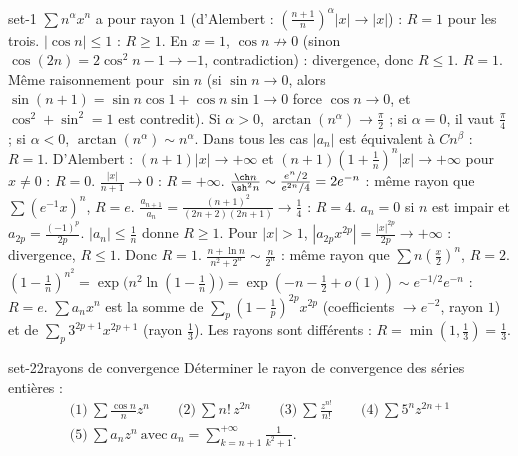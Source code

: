 \begin{corrige}{set-1}
 $\sum n^\alpha x^n$ a pour rayon $1$ (d'Alembert : $\left(\frac{n+1}n\right)^\alpha|x|\to|x|$) : $R=1$ pour les trois.
 $|\cos n|\leq1$ : $R\geq1$. En $x=1$, $\cos n\not\to0$ (sinon $\cos(2n)=2\cos^2n-1\to-1$, contradiction) : divergence, donc
$R\leq1$. $R=1$. Même raisonnement pour $\sin n$ (si $\sin n\to0$, alors $\sin(n+1)=\sin n\cos1+\cos n\sin1\to0$ force $\cos n\to0$, et
$\cos^2+\sin^2=1$ est contredit).
 Si $\alpha>0$, $\arctan(n^\alpha)\to\frac\pi2$ ; si $\alpha=0$, il vaut $\frac\pi4$ ; si $\alpha<0$, $\arctan(n^\alpha)\sim n^\alpha$. Dans tous les
cas $|a_n|$ est équivalent à $Cn^\beta$ : $R=1$.
 D'Alembert : $(n+1)|x|\to+\infty$ et $(n+1)\left(1+\frac1n\right)^n|x|\to+\infty$ pour $x\neq0$ : $R=0$.
 $\frac{|x|}{n+1}\to0$ : $R=+\infty$.
 $\frac{\ch n}{\sh^2n}\sim\frac{e^n/2}{e^{2n}/4}=2e^{-n}$ : même rayon que $\sum(e^{-1}x)^n$, $R=e$.
 $\frac{a_{n+1}}{a_n}=\frac{(n+1)^2}{(2n+2)(2n+1)}\to\frac14$ : $R=4$.
 $a_n=0$ si $n$ est impair et $a_{2p}=\frac{(-1)^p}{2p}$. $|a_n|\leq\frac1n$ donne $R\geq1$. Pour $|x|>1$, $|a_{2p}x^{2p}|=\frac{|x|^{2p}}{2p}\to+\infty$ :
divergence, $R\leq1$. Donc $R=1$.
 $\frac{n+\ln n}{n^2+2^n}\sim\frac n{2^n}$ : même rayon que $\sum n\left(\frac x2\right)^n$, $R=2$.
 $\left(1-\frac1n\right)^{n^2}=\exp\big(n^2\ln(1-\tfrac1n)\big)=\exp\left(-n-\frac12+o(1)\right)\sim e^{-1/2}e^{-n}$ : $R=e$.
 $\sum a_nx^n$ est la somme de $\sum_p\left(1-\frac1p\right)^{2p}x^{2p}$ (coefficients $\to e^{-2}$, rayon $1$) et de $\sum_p3^{2p+1}x^{2p+1}$ (rayon
$\frac13$). Les rayons sont différents : $R=\min\left(1,\frac13\right)=\frac13$.
\end{corrige}

\begin{exo}{set-2}{2}{rayons de convergence}
Déterminer le rayon de convergence des séries entières :
\begin{gather*}\text{(1)}\ \sum\frac{\cos n}nz^n\qquad\text{(2)}\ \sum n!\,z^{2n}\qquad\text{(3)}\ \sum\frac{z^{n!}}{n!}\qquad\text{(4)}\ \sum5^nz^{2n+1}\\
\text{(5)}\ \sum a_nz^n\ \text{avec}\ a_n=\sum_{k=n+1}^{+\infty}\frac1{k^2+1}.\end{gather*}
\end{exo}

